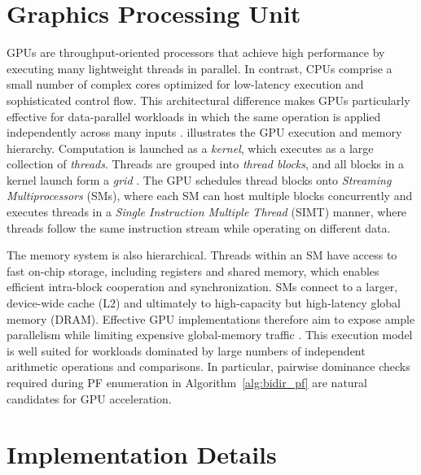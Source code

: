 \documentclass[letterpaper]{article}
\begin{document}


\newpage

\appendix

\section{Graphics Processing Unit}
\label{sec:prelim_gpu}

GPUs are throughput-oriented processors that achieve high performance by executing many lightweight threads in parallel. In contrast, CPUs comprise a small number of complex cores optimized for low-latency execution and sophisticated control flow. This architectural difference makes GPUs particularly effective for data-parallel workloads in which the same operation is applied independently across many inputs \cite{lindholm2008nvidia}.
 illustrates the GPU execution and memory hierarchy. Computation is launched as a \emph{kernel}, which executes as a large collection of \emph{threads}. Threads are grouped into \emph{thread blocks}, and all blocks in a kernel launch form a \emph{grid} \cite{nickolls2008scalable}. The GPU schedules thread blocks onto \emph{Streaming Multiprocessors} (SMs), where each SM can host multiple blocks concurrently and executes threads in a \emph{Single Instruction Multiple Thread} (SIMT) manner, where threads follow the same instruction stream while operating on different data.



The memory system is also hierarchical. Threads within an SM have access to fast on-chip storage, including registers and shared memory, which enables efficient intra-block cooperation and synchronization. SMs connect to a larger, device-wide cache (L2) and ultimately to high-capacity but high-latency global memory (DRAM). Effective GPU implementations therefore aim to expose ample parallelism while limiting expensive global-memory traffic \cite{nickolls2010gpu}.
This execution model is well suited for workloads dominated by large numbers of independent arithmetic operations and comparisons. In particular, pairwise dominance checks required during PF enumeration in Algorithm~\ref{alg:bidir_pf} are natural candidates for GPU acceleration.

\section{Implementation Details}
\label{app:implementation_details}
\end{document}
